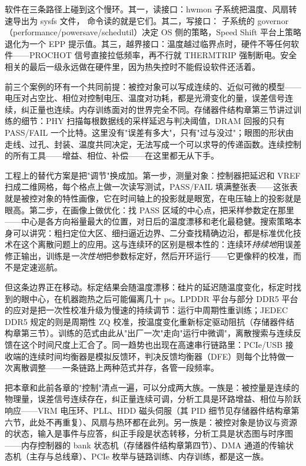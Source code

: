 软件在三条路径上碰到这个慢环。其一，读接口：hwmon 子系统把温度、风扇转速导出为 sysfs 文件， 命令读的就是它们。其二，写接口： 子系统的 governor（performance/powersave/schedutil）决定 OS 侧的策略，Speed Shift 平台上策略退化为一个 EPP 提示值。其三，越界接口：温度越过临界点时，硬件不等任何软件——PROCHOT 信号直接拉低频率，再不行就 THERMTRIP 强制断电。安全相关的最后一级永远做在硬件里，因为热失控时不能假设软件还活着。


前三个案例的环有一个共同前提：被控对象可以写成连续的、近似可微的模型——电压对占空比、相位对控制电压、温度对功耗，都是光滑变化的量，误差信号连续，纠正量也连续。内存训练面对的世界完全不同。存储器件结构章第三节讲过训练的细节：PHY 扫描每根数据线的采样延迟与判决阈值，DRAM 回报的只有 PASS/FAIL 一个比特。这里没有"误差有多大"，只有"过与没过"；眼图的形状由走线、过孔、封装、温度共同决定，无法写成一个可以求导的传递函数。连续控制的所有工具——增益、相位、补偿——在这里都无从下手。

工程上的替代方案是把"调节"换成加。第一步，测量对象：控制器把延迟和 VREF 扫成二维网格，每个格点上做一次读写测试，PASS/FAIL 填满整张表——这张表就是被控对象的特性画像，它在时间轴上的投影就是眼宽，在电压轴上的投影就是眼高。第二步，在画像上做优化：找 PASS 区域的中心点，把采样参数定在那里——中心是各方向裕量最大的位置，对日后的温度漂移和老化最稳健。搜索策略本身可以讲究：粗扫定位大区、细扫逼近边界、二分查找精确边沿，都是标准优化技术在这个离散问题上的应用。这与连续环的区别是根本性的：连续环\emph{持续地}用误差修正输出，训练是\emph{一次性地}把参数标定好，然后开环运行——它更像秤的校准，而不是定速巡航。

但这条边界正在移动。标定结果会随温度漂移：硅片的延迟随温度变化，标定时找到的眼中心，在机器跑热之后可能偏离几十 ps。LPDDR 平台与部分 DDR5 平台的应对是把一次性校准升级为慢速的持续调节：运行中周期性重训练；JEDEC DDR5 规定的则是周期性 ZQ 校准，按温度变化重新标定驱动阻抗（存储器件结构章第三节）。训练的范式由此从"出厂一次"走向"运行中微调"，离散搜索与连续反馈在这个时间尺度上汇合了。同一趋势也出现在高速串行链路里：PCIe/USB 接收端的连续时间均衡器是模拟反馈环，判决反馈均衡器（DFE）则每个比特做一次离散调整——一条链路上两种范式并存，各管一段频率。


把本章和此前各章的"控制"清点一遍，可以分成两大族。一族是：被控量是连续的物理量，误差信号连续存在，纠正量连续可调，分析工具是环路增益、相位与阶跃响应——VRM 电压环、PLL、HDD 磁头伺服（其 PID 细节见存储器件结构章第六节，此处不再重复）、风扇与热环都在此列。另一族是：被控对象是协议与资源的状态，输入是事件与应答，纠正手段是状态转移，分析工具是状态图与时序图——内存控制器的 bank 状态机（存储器件结构章第四节）、DMA 通道的传输状态机（主存与总线章）、PCIe 枚举与链路训练、内存训练，都是这一族。

